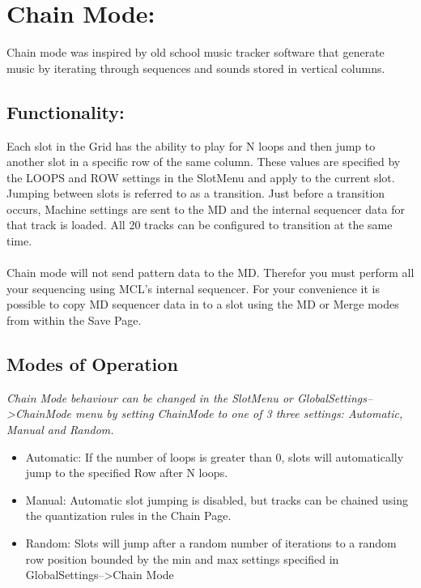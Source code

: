 \chapter{Chain Mode:}
Chain mode was inspired by old school music tracker software that generate music by iterating through sequences and sounds stored in vertical columns.
\section{Functionality:}
Each slot in the Grid has the ability to play for N loops and then jump to another slot in a specific row of the same column.  These values are specified by the LOOPS and ROW settings in the SlotMenu and apply to the current slot. Jumping between slots is referred to as a transition. Just before a transition occurs, Machine settings are sent to the MD and the internal sequencer data for that track is loaded. All 20 tracks can be configured to transition at the same time.\\
 \\
Chain mode will not send pattern data to the MD. Therefor you must perform all your sequencing using MCL's internal sequencer. For your convenience it is possible to copy MD sequencer data in to a slot using the MD or Merge modes from within the Save Page.
\section{Modes of Operation}
\textit{Chain Mode behaviour can be changed in the SlotMenu or GlobalSettings-->ChainMode menu by setting ChainMode to one of 3 three settings: Automatic, Manual and Random.}

\begin{itemize}
	\item Automatic: If the number of loops is greater than 0, slots will automatically jump to the specified Row after N loops.
	\item Manual: Automatic slot jumping is disabled, but tracks can be chained using the quantization rules in the Chain Page.
	\item Random: Slots will jump after a random number of iterations to a random row position bounded by the min and max settings specified in GlobalSettings-->Chain Mode
\end{itemize}


